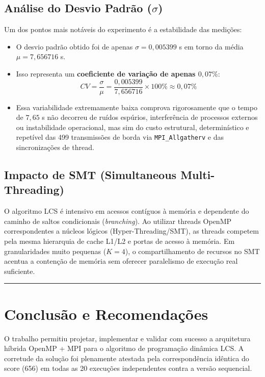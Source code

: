 \documentclass[12pt,a4paper]{article}
\begin{document}
\subsection*{Análise do Desvio Padrão ($\sigma$)}
Um dos pontos mais notáveis do experimento é a estabilidade das medições:
\begin{itemize}
    \item O desvio padrão obtido foi de apenas $\sigma = 0{,}005399$ s em torno da média $\mu = 7{,}656716$ s.
    \item Isso representa um \textbf{coeficiente de variação de apenas $0{,}07\%$}:
    \begin{equation}
    CV = \frac{\sigma}{\mu} = \frac{0{,}005399}{7{,}656716} \times 100\% \approx 0{,}07\%
    \end{equation}
    \item Essa variabilidade extremamente baixa comprova rigorosamente que o tempo de $7{,}65$ s não decorreu de ruídos espúrios, interferência de processos externos ou instabilidade operacional, mas sim do custo estrutural, determinístico e repetível das 499 transmissões de borda via \texttt{MPI\_Allgatherv} e das sincronizações de thread.
\end{itemize}

\subsection*{Impacto de SMT (Simultaneous Multi-Threading)}
O algoritmo LCS é intensivo em acessos contíguos à memória e dependente do caminho de saltos condicionais (\textit{branching}). Ao utilizar threads OpenMP correspondentes a núcleos lógicos (Hyper-Threading/SMT), as threads competem pela mesma hierarquia de cache L1/L2 e portas de acesso à memória. Em granularidades muito pequenas ($K = 4$), o compartilhamento de recursos no SMT acentua a contenção de memória sem oferecer paralelismo de execução real suficiente.

\vspace{0.5cm}
\hrule
\vspace{0.5cm}

\section{Conclusão e Recomendações}

O trabalho permitiu projetar, implementar e validar com sucesso a arquitetura híbrida OpenMP + MPI para o algoritmo de programação dinâmica LCS. A corretude da solução foi plenamente atestada pela correspondência idêntica do score (656) em todas as 20 execuções independentes contra a versão sequencial.
\end{document}
